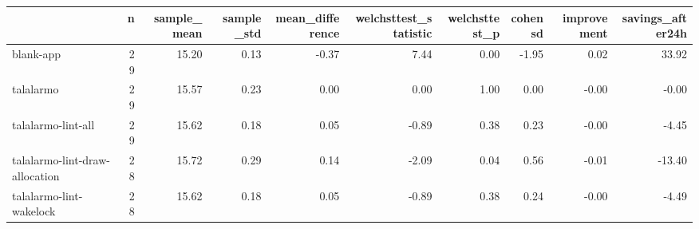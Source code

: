 \begin{tabular}{lrrrrrrrrr}
\toprule
{} &   n &  sample\_mean &  sample\_std &  mean\_difference &  welchsttest\_statistic &  welchsttest\_p &  cohensd &  improvement &  savings\_after24h \\
\midrule
blank-app                      &  29 &        15.20 &        0.13 &            -0.37 &                   7.44 &           0.00 &    -1.95 &         0.02 &             33.92 \\
talalarmo                      &  29 &        15.57 &        0.23 &             0.00 &                   0.00 &           1.00 &     0.00 &        -0.00 &             -0.00 \\
talalarmo-lint-all             &  29 &        15.62 &        0.18 &             0.05 &                  -0.89 &           0.38 &     0.23 &        -0.00 &             -4.45 \\
talalarmo-lint-draw-allocation &  28 &        15.72 &        0.29 &             0.14 &                  -2.09 &           0.04 &     0.56 &        -0.01 &            -13.40 \\
talalarmo-lint-wakelock        &  28 &        15.62 &        0.18 &             0.05 &                  -0.89 &           0.38 &     0.24 &        -0.00 &             -4.49 \\
\bottomrule
\end{tabular}
